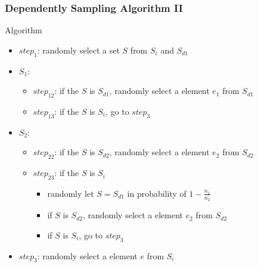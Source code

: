 \documentclass[notheorems, aspectratio=54]{beamer}
\begin{document}
\begin{frame}
    \frametitle{Dependently Sampling Algorithm II}
    \begin{block}{Algorithm}
        \begin{itemize}
            \item $step_{1}$: randomly select a set $S$ from $S_i$ and $S_{d1}$
            \item $S_1$:
            \begin{itemize}
                \item $step_{12}$: if the $S$ is $S_{d1}$, randomly select a element $e_1$ from $S_{d1}$
                \item $step_{13}$: if the $S$ is $S_i$, go to $step_{3}$
            \end{itemize}
            \item $S_2$:
            \begin{itemize}
                \item $step_{22}$: if the $S$ is $S_{d2}$, randomly select a element $e_2$ from $S_{d2}$
                \item $step_{23}$: if the $S$ is $S_i$
                \begin{itemize}
                    \item randomly let $S = S_{d1}$ in probability of $1-\frac{n_1}{n_2}$
                    \item if $S$ is $S_{d2}$, randomly select a element $e_2$ from $S_{d2}$
                    \item if $S$ is $S_i$, go to $step_{3}$
                \end{itemize}
            \end{itemize}
            \item $step_{3}$: randomly select a element $e$ from $S_i$
        \end{itemize}
    \end{block}
\end{frame}
\end{document}

